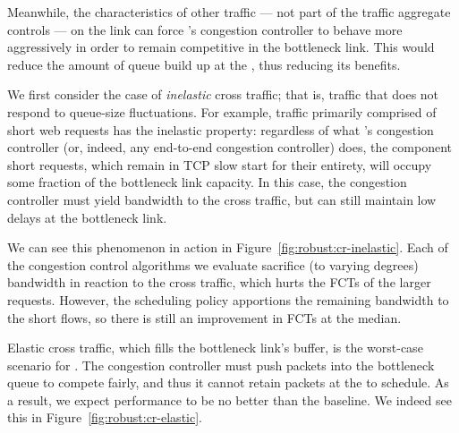 



Meanwhile, the characteristics of other traffic --- not part of the traffic aggregate \name controls --- on the link can force \name's congestion controller to behave more aggressively in order to remain competitive in the bottleneck link. This would reduce the amount of queue build up at the \name, thus reducing its benefits.


 We first consider the case of \emph{inelastic} cross traffic; that is, traffic that does not respond to queue-size fluctuations.
For example, traffic primarily comprised of short web requests has the inelastic property: regardless of what \name's congestion controller (or, indeed, any end-to-end congestion controller) does, the component short requests, which remain in TCP slow start for their entirety, will occupy some fraction of the bottleneck link capacity.
In this case, the congestion controller must yield bandwidth to the cross traffic, but can still maintain low delays at the bottleneck link.

We can see this phenomenon in action in Figure~\ref{fig:robust:cr-inelastic}. 
Each of the congestion control algorithms we evaluate sacrifice (to varying degrees) bandwidth in reaction to the cross traffic, which hurts the FCTs of the larger requests.
However, the scheduling policy apportions the remaining bandwidth to the short flows, so there is still an improvement in FCTs at the median.


 Elastic cross traffic, which fills the bottleneck link's buffer, is the worst-case scenario for \name.
The congestion controller must push packets into the bottleneck queue to compete fairly, and thus it cannot retain packets at the \inbox to schedule.
As a result, we expect performance to be no better than the baseline.
We indeed see this in Figure~\ref{fig:robust:cr-elastic}.


